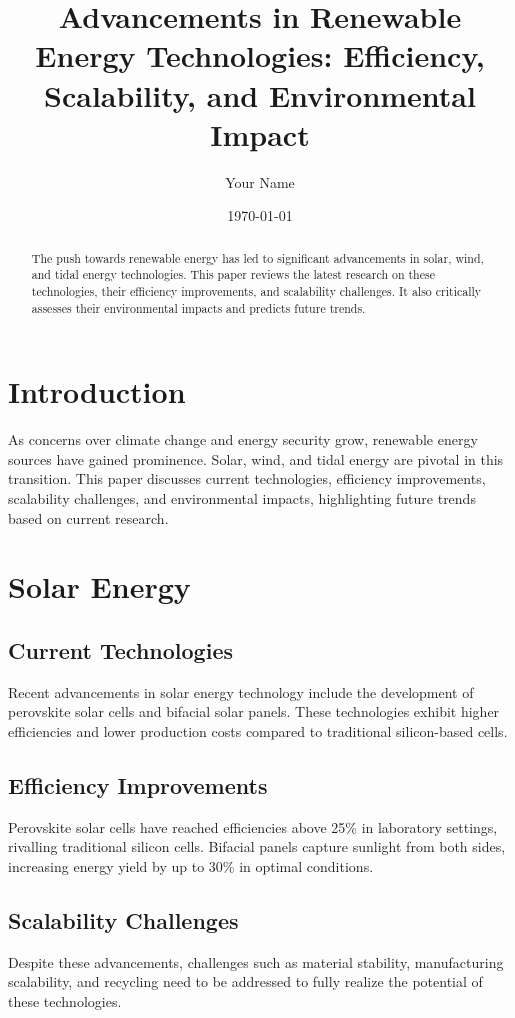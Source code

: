 \documentclass[12pt]{article}
\title{Advancements in Renewable Energy Technologies: Efficiency, Scalability, and Environmental Impact}
\author{Your Name}
\date{\today}
\begin{document}
\maketitle

\begin{abstract}
The push towards renewable energy has led to significant advancements in solar, wind, and tidal energy technologies. This paper reviews the latest research on these technologies, their efficiency improvements, and scalability challenges. It also critically assesses their environmental impacts and predicts future trends.
\end{abstract}

\section{Introduction}
As concerns over climate change and energy security grow, renewable energy sources have gained prominence. Solar, wind, and tidal energy are pivotal in this transition. This paper discusses current technologies, efficiency improvements, scalability challenges, and environmental impacts, highlighting future trends based on current research.

\section{Solar Energy}
\subsection{Current Technologies}
Recent advancements in solar energy technology include the development of perovskite solar cells and bifacial solar panels\cite{Green2019,Kojima2009}. These technologies exhibit higher efficiencies and lower production costs compared to traditional silicon-based cells.

\subsection{Efficiency Improvements}
Perovskite solar cells have reached efficiencies above 25\% in laboratory settings, rivalling traditional silicon cells\cite{Park2016}. Bifacial panels capture sunlight from both sides, increasing energy yield by up to 30\% in optimal conditions\cite{Sanyo2008}.

\subsection{Scalability Challenges}
Despite these advancements, challenges such as material stability, manufacturing scalability, and recycling need to be addressed to fully realize the potential of these technologies\cite{Yan2019}.
\end{document}
